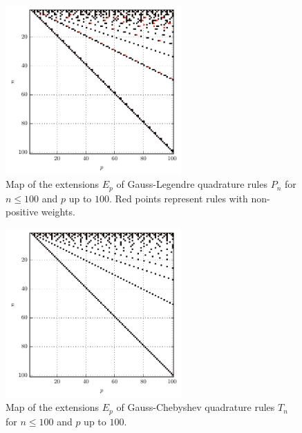 \documentclass[a4paper,10pt]{article}
\begin{document}
\begin{figure}
  \centering
  \includegraphics[width=0.6\textwidth]{./img/map_leg_100_100.pdf}
  \caption{Map of the extensions $E_p$ of Gauss-Legendre quadrature rules
           $P_n$ for $n \leq 100$ and $p$ up to $100$.
           Red points represent rules with non-positive weights.}
  \label{fig:map_leg_100_100}
\end{figure}

\begin{figure}
  \centering
  \includegraphics[width=0.6\textwidth]{./img/map_chebt_100_100.pdf}
  \caption{Map of the extensions $E_p$ of Gauss-Chebyshev quadrature rules
           $T_n$ for $n \leq 100$ and $p$ up to $100$.}
  \label{fig:map_chebt_50_50}
\end{figure}
\end{document}
